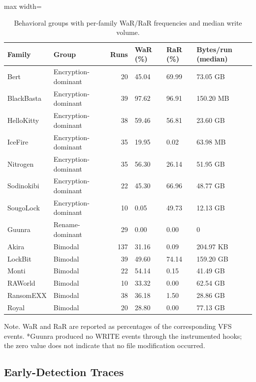 \begin{table}[htbp]
\centering
\caption{Behavioral groups with per-family WaR/\allowbreak{}RaR frequencies and median write volume.}\label{tab:4-5}
\begin{adjustbox}{max width=\textwidth}
\small
\begin{tabular}{llrlll}
\hline
\textbf{Family} & \textbf{Group} & \textbf{Runs} & \textbf{WaR (\%)} & \textbf{RaR (\%)} & \textbf{Bytes/\allowbreak{}run (median)} \\
\hline
Bert & Encryption-dominant & 20 & 45.04 & 69.99 & 73.05 GB \\
BlackBasta & Encryption-dominant & 39 & 97.62 & 96.91 & 150.20 MB \\
HelloKitty & Encryption-dominant & 38 & 59.46 & 56.81 & 23.60 GB \\
IceFire & Encryption-dominant & 35 & 19.95 & 0.02 & 63.98 MB \\
Nitrogen & Encryption-dominant & 35 & 56.30 & 26.14 & 51.95 GB \\
Sodinokibi & Encryption-dominant & 22 & 45.30 & 66.96 & 48.77 GB \\
SougoLock & Encryption-dominant & 10 & 0.05 & 49.73 & 12.13 GB \\
Guunra & Rename-dominant & 29 & 0.00 & 0.00 & 0 \\
Akira & Bimodal & 137 & 31.16 & 0.09 & 204.97 KB \\
LockBit & Bimodal & 39 & 49.60 & 74.14 & 159.20 GB \\
Monti & Bimodal & 22 & 54.14 & 0.15 & 41.49 GB \\
RAWorld & Bimodal & 10 & 33.32 & 0.00 & 62.54 GB \\
RansomEXX & Bimodal & 38 & 36.18 & 1.50 & 28.86 GB \\
Royal & Bimodal & 20 & 28.80 & 0.00 & 77.13 GB \\
\hline
\end{tabular}
\end{adjustbox}
\end{table}

Note. WaR and RaR are reported as percentages of the corresponding VFS events. *Guunra produced no WRITE events through the instrumented hooks; the zero value does not indicate that no file modification occurred.

\subsection{Early-Detection Traces}\label{sec:4.4.2}

